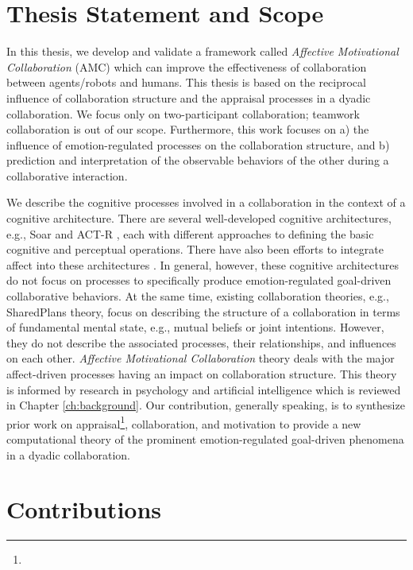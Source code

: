 \documentclass[12pt]{report}
\begin{document}
\section{Thesis Statement and Scope}

In this thesis, we develop and validate a framework called \textit{Affective
Motivational Collaboration} (AMC) which can improve the effectiveness of
collaboration between agents/robots and humans. This thesis is based on the
reciprocal influence of collaboration structure and the appraisal processes in a
dyadic collaboration. We focus only on two-participant collaboration; teamwork
collaboration is out of our scope. Furthermore, this work focuses on a) the
influence of emotion-regulated processes on the collaboration structure, and b)
prediction and interpretation of the observable behaviors of the other during a
collaborative interaction.

We describe the cognitive processes involved in a collaboration in the context
of a cognitive architecture. There are several well-developed cognitive
architectures, e.g., Soar \cite{laird:soar} and ACT-R \cite{anderson:act-r},
each with different approaches to defining the basic cognitive and perceptual
operations. There have also been efforts to integrate affect into these
architectures \cite{dancy:actR-physiology-affect, marinier:behavior-emotion}. In
general, however, these cognitive architectures do not focus on processes to
specifically produce emotion-regulated goal-driven collaborative behaviors. At
the same time, existing collaboration theories, e.g., SharedPlans
\cite{grosz:plans-discourse} theory, focus on describing the structure of a
collaboration in terms of fundamental mental state, e.g., mutual beliefs or
joint intentions. However, they do not describe the associated processes, their
relationships, and influences on each other. \textit{Affective Motivational
Collaboration} theory deals with the major affect-driven processes having an
impact on collaboration structure. This theory is informed by research in
psychology and artificial intelligence which is reviewed in Chapter
\ref{ch:background}. Our contribution, generally speaking, is to synthesize
prior work on appraisal\footnote{\color{red}{We have chosen appraisal-based
modeling of emotions among several theories of emotions.}}, collaboration, and
motivation to provide a new computational theory of the prominent
emotion-regulated goal-driven phenomena in a dyadic collaboration.

\section{Contributions}
\end{document}
